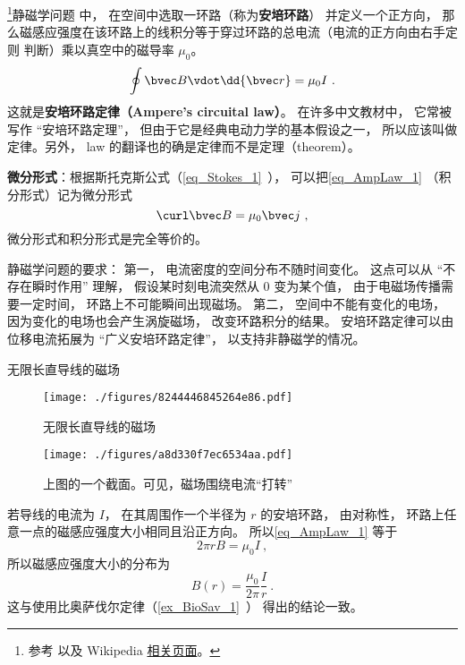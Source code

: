 

\footnote{参考 \cite{GriffE} 以及 Wikipedia \href{https://en.wikipedia.org/wiki/Amp\%C3\%A8re's_circuital_law}{相关页面}。}静磁学问题%
中， 在空间中选取一环路（称为\textbf{安培环路}） 并定义一个正方向， 那么磁感应强度在该环路上的线积分等于穿过环路的总电流（电流的正方向由右手定则 判断）乘以真空中的磁导率 $\mu_0$。
\begin{equation}\label{eq_AmpLaw_1}
\oint \bvec B \vdot \dd{\bvec r} = \mu_0 I~.
\end{equation}
这就是\textbf{安培环路定律（Ampere's circuital law）}。 在许多中文教材中， 它常被写作 “安培环路定理”， 但由于它是经典电动力学的基本假设之一， 所以应该叫做定律。另外， law 的翻译也的确是定律而不是定理（theorem）。

\textbf{微分形式}：根据斯托克斯公式（\autoref{eq_Stokes_1}~）， 可以把\autoref{eq_AmpLaw_1} （积分形式）记为微分形式
\begin{equation}\label{eq_AmpLaw_2}
\curl \bvec B = \mu_0 \bvec j~,
\end{equation}
微分形式和积分形式是完全等价的。

静磁学问题的要求： 第一， 电流密度的空间分布不随时间变化。 这点可以从 “不存在瞬时作用” 理解， 假设某时刻电流突然从 0 变为某个值， 由于电磁场传播需要一定时间， 环路上不可能瞬间出现磁场。 第二， 空间中不能有变化的电场， 因为变化的电场也会产生涡旋磁场， 改变环路积分的结果。 安培环路定律可以由位移电流拓展为 “广义安培环路定律”， 以支持非静磁学的情况。

\begin{example}{无限长直导线的磁场}\label{ex_AmpLaw_1}
\begin{figure}[ht]
\centering
\texttt{[image: ./figures/8244446845264e86.pdf]}
\caption{无限长直导线的磁场} \label{fig_AmpLaw_2}
\end{figure}

\begin{figure}[ht]
\centering
\texttt{[image: ./figures/a8d330f7ec6534aa.pdf]}
\caption{上图的一个截面。可见，磁场围绕电流“打转”} \label{fig_AmpLaw1}
\end{figure}

若导线的电流为 $I$， 在其周围作一个半径为 $r$ 的安培环路， 由对称性， 环路上任意一点的磁感应强度大小相同且沿正方向。 所以\autoref{eq_AmpLaw_1} 等于
\begin{equation}
2\pi r B = \mu_0 I~,
\end{equation}
所以磁感应强度大小的分布为
\begin{equation}
B(r) = \frac{\mu_0}{2\pi} \frac Ir~.
\end{equation}
这与使用比奥萨伐尔定律（\autoref{ex_BioSav_1}~） 得出的结论一致。
\end{example}

